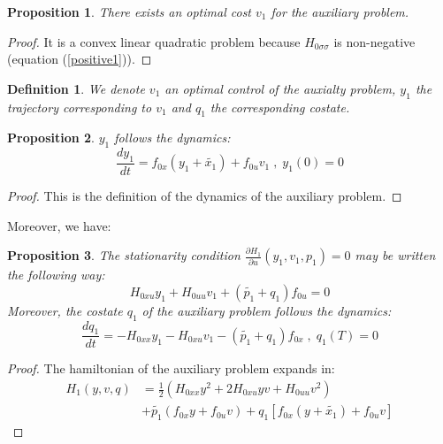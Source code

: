 \documentclass[a4paper,10pt]{article}
\newtheorem{definition}{Definition}
\newtheorem{proposition}{Proposition}
\begin{document}
\begin{proposition}
    There exists an optimal cost $v_{1}$ for the auxiliary problem.
\end{proposition}
\begin{proof}
    It is a convex linear quadratic problem because $H_{0 \sigma \sigma}$ is 
    non-negative (equation  (\ref{positive1})).
\end{proof}
\begin{definition}
	We denote $v_{1}$ an optimal control of the auxialty problem, $y_{1}$ the trajectory corresponding to 
	$v_{1}$ and $q_{1}$ the corresponding costate.
\end{definition}
\begin{proposition}
	$y_{1}$ follows the dynamics:
	\begin{equation}
	    \frac{dy_{1}}{dt} = f_{0x}(y_{1}+\tilde{x_{1}}) + f_{0u}v_{1} \; , \; 
		y_{1}(0)=0
	    \label{optauxstate}
	\end{equation}
\end{proposition}
\begin{proof}
	This is the definition of the dynamics of the auxiliary 
	problem.
\end{proof}
Moreover, we have:
\begin{proposition}
	The stationarity condition $\frac{\partial H_{1}}{\partial u}(y_{1},v_{1},p_{1})  
	= 0$ may be written the following way:
	\begin{equation}
	    H_{0xu} y_{1} + H_{0uu} v_{1} +(\tilde{p_{1}} + q_{1}) f_{0u} = 0
	    \label{auxstationarity}
	\end{equation}
	Moreover, the costate $q_{1}$ of the auxiliary problem follows the 
	dynamics:
	\begin{equation}
	    \frac{dq_{1}}{dt} = - H_{0xx} y_{1} - H_{0xu} v_{1} -
	    (\tilde{p_{1}} +q_{1}) f_{0x}
	    \; , \; q_{1}(T) = 0
	    \label{auxcostate}
	\end{equation}
\end{proposition}
\begin{proof}
	The hamiltonian of the auxiliary problem expands in:
\begin{equation}
	\label{auxhamiltonian}
	\begin{split}
    H_{1}(y,v,q) & = \frac{1}{2}\left(H_{0xx}y^{2} + 2 H_{0xu}yv + 
	H_{0uu}v^{2}\right) \\
    & + \tilde{p_{1}}\left(f_{0x}y +f_{0u}v\right)
    +q_{1}\left[f_{0x}(y+\tilde{x_{1}}) + f_{0u}v\right]
    \end{split}
\end{equation}
\end{proof}
\end{document}
